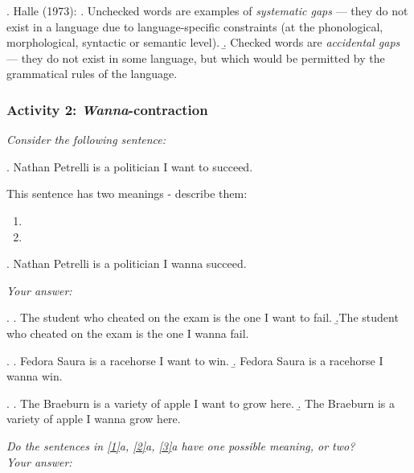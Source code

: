 \documentclass[11pt, oneside]{article}   	%
\begin{document}
\ex. Halle (1973):
\a. Unchecked words are examples of {\itshape systematic gaps} --- they do not exist in a language due to language-specific constraints (at the phonological, morphological, syntactic or semantic level).
\b. Checked words are {\itshape accidental gaps} --- they do not exist in some language, but which would be permitted by the grammatical rules of the language. 

\subsubsection{Activity 2: {\itshape Wanna}-contraction}

{\itshape Consider the following sentence:}

\ex. Nathan Petrelli is a politician I want to succeed.

\newpage

This sentence has two meanings - describe them:

\begin{enumerate}
	\item 
	\item	
\end{enumerate}
 
 
\ex. Nathan Petrelli is a politician I wanna succeed.
 
\par {\itshape Your answer:}
 
\vspace{1.5cm} 



\ex. \label{1} \a. The student who cheated on the exam is the one I want to fail.
\b.The student who cheated on the exam is the one I wanna fail.

\ex. \label{2} \a. Fedora Saura is a racehorse I want to win.
\b. Fedora Saura is a racehorse I wanna win.

\ex. \label{3} \a. The Braeburn is a variety of apple I want to grow here.
\b. The Braeburn is a variety of apple I wanna grow here.

{\itshape Do the sentences in \ref{1}a, \ref{2}a, \ref{3}a have one possible meaning, or two? \\

Your answer:} \\

\vspace{1.5cm}
\end{document}
